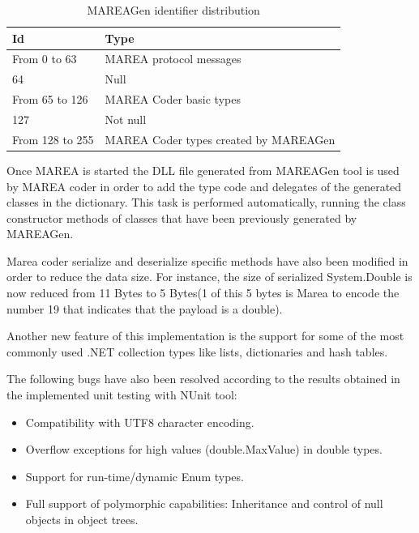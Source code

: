 \begin{table}[H]
\begin{center}
\caption{\nohyphens{MAREAGen identifier distribution}}
\label{T:Messages-Id}
\begin{tabular}{|l|p{7.3cm}|}
\hline
 {\bf Id} & {\bf Type} 												\\ \hline \hline
 From 0 to 63 & MAREA protocol messages\\ \hline
 64 & Null\\ \hline
 From 65 to 126 & MAREA Coder basic types \\ \hline
 127 & Not null\\ \hline
 From 128 to 255 & MAREA Coder types created by MAREAGen\\ \hline
\end{tabular}
\end{center}
\end{table}

Once MAREA is started the DLL file generated from MAREAGen tool is used by MAREA coder in order to add the type code and delegates of the generated classes in the dictionary. This task is performed automatically, running the class constructor methods of classes that have been previously generated by MAREAGen.

Marea coder serialize and deserialize specific methods have also been modified in order to reduce the data size. For instance, the size of serialized System.Double is now reduced from 11 Bytes to 5 Bytes(1 of this 5 bytes is Marea  to encode the number 19 that indicates that the payload is a double).

Another new feature of this implementation is the support for some of the most commonly used  .NET collection types like lists, dictionaries and hash tables. 

The following bugs have also been resolved according to the results obtained in the implemented unit testing with NUnit tool:

\begin{itemize}
\item Compatibility with UTF8 character encoding.
\item Overflow exceptions for high values (double.MaxValue) in double types.
\item Support for run-time/dynamic Enum types.
\item Full support of polymorphic capabilities: Inheritance and control of null objects in object trees.
\end{itemize}
	

